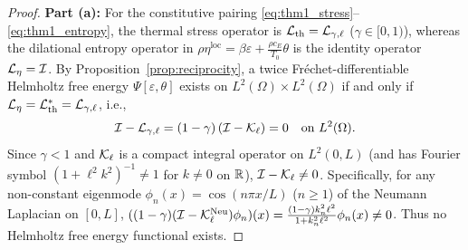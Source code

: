 \begin{proof}
\textbf{Part (a):} For the constitutive pairing \eqref{eq:thm1_stress}--\eqref{eq:thm1_entropy}, the thermal stress operator is $\mathcal{L}_{\mathrm{th}} = \mathcal{L}_{\gamma,\ell}$ ($\gamma \in [0,1)$), whereas the dilational entropy operator in $\rho\eta^{\mathrm{loc}} = \beta\varepsilon + \frac{\rho c_E}{T_0}\theta$ is the identity operator $\mathcal{L}_\eta = \mathcal{I}$. By Proposition~\ref{prop:reciprocity}, a twice Fr{\'e}chet-differentiable Helmholtz free energy $\Psi[\varepsilon,\theta]$ exists on $L^2(\Omega) \times L^2(\Omega)$ if and only if $\mathcal{L}_\eta = \mathcal{L}_{\mathrm{th}}^* = \mathcal{L}_{\gamma,\ell}$, i.e.,
\begin{equation}\label{eq:app_defect_op}
  \mathcal{I} - \mathcal{L}_{\gamma,\ell} = (1-\gamma)\left(\mathcal{I} - \mathcal{K}_\ell\right) = 0 \quad \text{on } L^2(\Omega).
\end{equation}
Since $\gamma < 1$ and $\mathcal{K}_\ell$ is a compact integral operator on $L^2(0,L)$ (and has Fourier symbol $(1+\ell^2 k^2)^{-1} \neq 1$ for $k \neq 0$ on $\mathbb{R}$), $\mathcal{I} - \mathcal{K}_\ell \neq 0$. Specifically, for any non-constant eigenmode $\phi_n(x) = \cos(n\pi x/L)$ ($n \ge 1$) of the Neumann Laplacian on $[0,L]$, $((1-\gamma)(\mathcal{I} - \mathcal{K}_\ell^{\mathrm{Neu}})\phi_n)(x) = \frac{(1-\gamma)k_n^2\ell^2}{1+k_n^2\ell^2}\phi_n(x) \neq 0$. Thus no Helmholtz free energy functional exists.


\end{proof}
